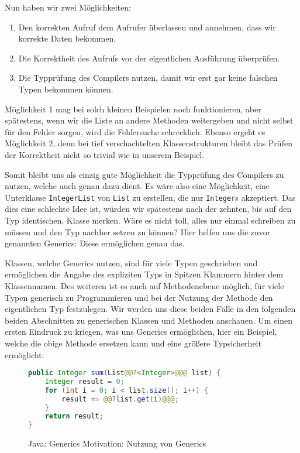 		Nun haben wir zwei Möglichkeiten:
		\begin{enumerate}
			\item Den korrekten Aufruf dem Aufrufer überlassen und annehmen, dass wir korrekte Daten bekommen.
			\item Die Korrektheit des Aufrufs vor der eigentlichen Ausführung überprüfen.
			\item Die Typprüfung des Compilers nutzen, damit wir erst gar keine falschen Typen bekommen können.
		\end{enumerate}
		Möglichkeit 1 mag bei solch kleinen Beispielen noch funktionieren, aber spätestens, wenn wir die Liste an andere Methoden weitergeben und nicht selbst für den Fehler sorgen, wird die Fehlersuche schrecklich. Ebenso ergeht es Möglichkeit 2, denn bei tief verschachtelten Klassenstrukturen bleibt das Prüfen der Korrektheit nicht so trivial wie in unserem Beispiel.
		
		
		Somit bleibt uns als einzig gute Möglichkeit die Typprüfung des Compilers zu nutzen, welche auch genau dazu dient. Es wäre also eine Möglichkeit, eine Unterklasse \texttt{IntegerList} von \texttt{List} zu erstellen, die nur \texttt{Integer}s akzeptiert. Das dies eine schlechte Idee ist, würden wir spätestens nach der zehnten, bis auf den Typ identischen, Klasse merken. Wäre es nicht toll, alles nur einmal schreiben zu müssen und den Typ nachher setzen zu können? Hier helfen uns die zuvor genannten Generics: Diese ermöglichen genau das.
		
		Klassen, welche Generics nutzen, sind für viele Typen geschrieben und ermöglichen die Angabe des expliziten Typs in Spitzen Klammern hinter dem Klassennamen. Des weiteren ist es auch auf Methodenebene möglich, für viele Typen generisch zu Programmieren und bei der Nutzung der Methode den eigentlichen Typ festzulegen. Wir werden uns diese beiden Fälle in den folgenden beiden Abschnitten zu generischen Klassen und Methoden anschauen. Um einen ersten Eindruck zu kriegen, was uns Generics ermöglichen, hier ein Beispiel, welche die obige Methode ersetzen kann und eine größere Typsicherheit ermöglicht:
		\begin{figure}[H]
			\centering
			\begin{lstlisting}[language = Java, style = base]
public Integer sum(List@@?<Integer>@@@ list) {
	Integer result = 0;
	for (int i = 0; i < list.size(); i++) {
		result += @@?list.get(i)@@@;
	}
	return result;
}
			\end{lstlisting}
			\caption{Java: Generics Motivation: Nutzung von Generics}
			\label{fig:java_generics_motivation_gen}
		\end{figure}
		
